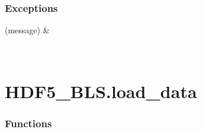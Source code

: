 \documentclass[letterpaper,10pt,english]{sphinxmanual}
\begin{document}
\subsubsection*{Exceptions}


\begin{savenotes}\sphinxattablestart
\sphinxthistablewithglobalstyle
\sphinxthistablewithnovlinesstyle
\centering
\begin{tabulary}{\linewidth}[t]{}
\sphinxtoprule
\sphinxtableatstartofbodyhook
\sphinxAtStartPar
{}(message)
&
\sphinxAtStartPar

\\
\sphinxbottomrule
\end{tabulary}
\sphinxtableafterendhook\par
\sphinxattableend\end{savenotes}

\sphinxstepscope


\section{HDF5\_BLS.load\_data}
\label{\detokenize{_autosummary/HDF5_BLS.load_data:module-HDF5_BLS.load_data}}\label{\detokenize{_autosummary/HDF5_BLS.load_data:hdf5-bls-load-data}}\label{\detokenize{_autosummary/HDF5_BLS.load_data::doc}}\subsubsection*{Functions}
\end{document}
